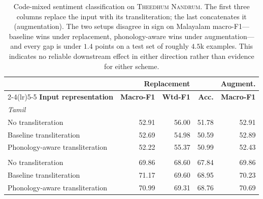 \begin{table}[t]
\centering
\small
\begin{tabular}{lrrrr}
\toprule
& \multicolumn{3}{c}{\textbf{Replacement}} & \textbf{Augment.} \\
\cmidrule(lr){2-4}\cmidrule(lr){5-5}
\textbf{Input representation} & \textbf{Macro-F1} & \textbf{Wtd-F1} & \textbf{Acc.} & \textbf{Macro-F1} \\
\midrule
\multicolumn{5}{l}{\textit{Tamil}} \\
\quad No transliteration & 52.91 & 56.00 & 51.78 & 52.91 \\
\quad Baseline transliteration & 52.69 & 54.98 & 50.59 & 52.89 \\
\quad Phonology-aware transliteration & 52.22 & 55.37 & 50.99 & 52.43 \\
\addlinespace
\multicolumn{5}{l}{\textit{Malayalam}} \\
\quad No transliteration & 69.86 & 68.60 & 67.84 & 69.86 \\
\quad Baseline transliteration & 71.17 & 69.60 & 68.95 & 70.23 \\
\quad Phonology-aware transliteration & 70.99 & 69.31 & 68.76 & 70.69 \\
\bottomrule
\end{tabular}
\caption{Code-mixed sentiment classification on \textsc{Theedhum Nandrum}. The first three columns replace the input with its transliteration; the last concatenates it (augmentation). The two setups disagree in sign on Malayalam macro-F1---baseline wins under replacement, phonology-aware wins under augmentation---and every gap is under $1.4$ points on a test set of roughly $4.5$k examples. This indicates no reliable downstream effect in either direction rather than evidence for either scheme.}
\label{tab:downstream}
\end{table}